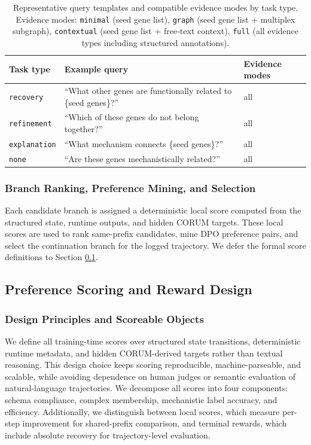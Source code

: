 \documentclass[thesis,letterpaper,12pt]{utthesis}
\begin{document}
\begin{table}[ht]
\centering
\caption{Representative query templates and compatible evidence modes by task type. Evidence modes: \texttt{minimal} (seed gene list), \texttt{graph} (seed gene list + multiplex subgraph), \texttt{contextual} (seed gene list + free-text context), \texttt{full} (all evidence types including structured annotations).}
\label{tbl:query-templates}
\begin{tabularx}{\textwidth}{l Y l}
\toprule
\textbf{Task type} & \textbf{Example query} & \textbf{Evidence modes} \\
\midrule
\texttt{recovery} & ``What other genes are functionally related to \{seed genes\}?'' & all \\
\texttt{refinement} & ``Which of these genes do not belong together?'' & all \\
\texttt{explanation} & ``What mechanism connects \{seed genes\}?'' & all \\
\texttt{none} & ``Are these genes mechanistically related?'' & all \\
\bottomrule
\end{tabularx}
\end{table}

\subsubsection{Branch Ranking, Preference Mining, and Selection}\label{sec:branch-ranking}
Each candidate branch is assigned a deterministic local score computed from the structured state, runtime outputs, and hidden CORUM targets. These local scores are used to rank same-prefix candidates, mine DPO preference pairs, and select the continuation branch for the logged trajectory. We defer the formal score definitions to Section \ref{sec:rewards}.

\subsection{Preference Scoring and Reward Design}\label{sec:rewards}
\subsubsection{Design Principles and Scoreable Objects}
We define all training-time scores over structured state transitions, deterministic runtime metadata, and hidden CORUM-derived targets rather than textual reasoning. This design choice keeps scoring reproducible, machine-parseable, and scalable, while avoiding dependence on human judges or semantic evaluation of natural-language trajectories. We decompose all scores into four components: schema compliance, complex membership, mechanistic label accuracy, and efficiency. Additionally, we distinguish between local scores, which measure per-step improvement for shared-prefix comparison, and terminal rewards, which include absolute recovery for trajectory-level evaluation.
\end{document}
